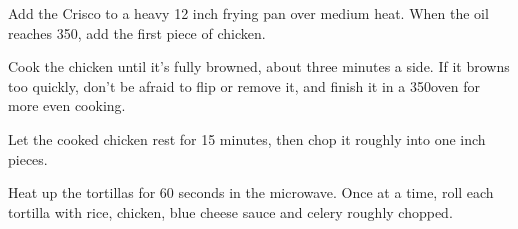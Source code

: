 \begin{recipe}
Add the Crisco to a heavy 12 inch frying pan over medium heat. When the oil reaches 350\degree, add the first piece of chicken.

Cook the chicken until it's fully browned, about three minutes a side. If it browns too quickly, don't be afraid to flip or remove it, and finish it in a 350\degree oven for more even cooking.

Let the cooked chicken rest for 15 minutes, then chop it roughly into one inch pieces.


Heat up the tortillas for 60 seconds in the microwave. Once at a time, roll each tortilla with rice, chicken, blue cheese sauce and celery roughly chopped.

\end{recipe}
